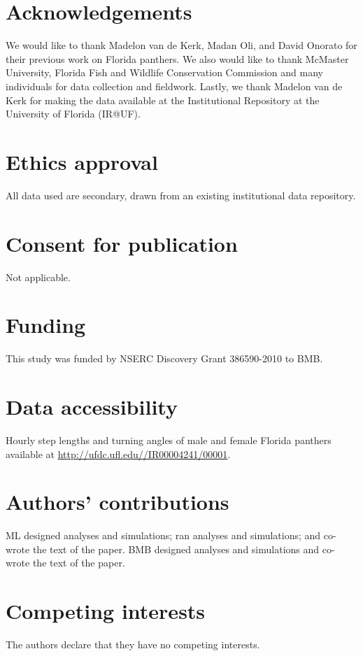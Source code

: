 \documentclass{bmcart}
\begin{document}
\begin{backmatter}

\section*{Acknowledgements}

We would like to thank Madelon van de Kerk, Madan Oli, and David Onorato for their previous work on Florida panthers. We also would like to thank McMaster University, Florida Fish and Wildlife Conservation Commission and many individuals for data collection and fieldwork. Lastly, we thank Madelon van de Kerk for making the data available at the Institutional Repository at the University of Florida (IR@UF).

\section*{Ethics approval}

All data used are secondary, drawn from an existing institutional
data repository.

\section*{Consent for publication}

Not applicable.
  
\section*{Funding}

This study was funded by NSERC Discovery Grant 386590-2010 to BMB.

\section{Data accessibility}
Hourly step lengths and turning angles of male and female Florida panthers available at \url{http://ufdc.ufl.edu//IR00004241/00001}.

\section*{Authors' contributions}
ML designed analyses and simulations; ran analyses and simulations; and co-wrote the text of the paper.  BMB designed analyses and simulations and co-wrote the text of the paper.

\section*{Competing interests}
The authors declare that they have no competing interests.


\end{backmatter}
\end{document}
